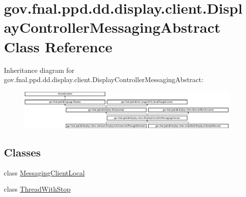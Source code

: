 \hypertarget{classgov_1_1fnal_1_1ppd_1_1dd_1_1display_1_1client_1_1DisplayControllerMessagingAbstract}{\section{gov.\-fnal.\-ppd.\-dd.\-display.\-client.\-Display\-Controller\-Messaging\-Abstract Class Reference}
\label{classgov_1_1fnal_1_1ppd_1_1dd_1_1display_1_1client_1_1DisplayControllerMessagingAbstract}
}
Inheritance diagram for gov.\-fnal.\-ppd.\-dd.\-display.\-client.\-Display\-Controller\-Messaging\-Abstract\-:\begin{figure}[H]
\begin{center}
\leavevmode
\includegraphics[height=2.015839cm]{classgov_1_1fnal_1_1ppd_1_1dd_1_1display_1_1client_1_1DisplayControllerMessagingAbstract}
\end{center}
\end{figure}
\subsection*{Classes}
\begin{DoxyCompactItemize}
\item 
class \hyperlink{classgov_1_1fnal_1_1ppd_1_1dd_1_1display_1_1client_1_1DisplayControllerMessagingAbstract_1_1MessagingClientLocal}{Messaging\-Client\-Local}
\item 
class \hyperlink{classgov_1_1fnal_1_1ppd_1_1dd_1_1display_1_1client_1_1DisplayControllerMessagingAbstract_1_1ThreadWithStop}{Thread\-With\-Stop}
\end{DoxyCompactItemize}
